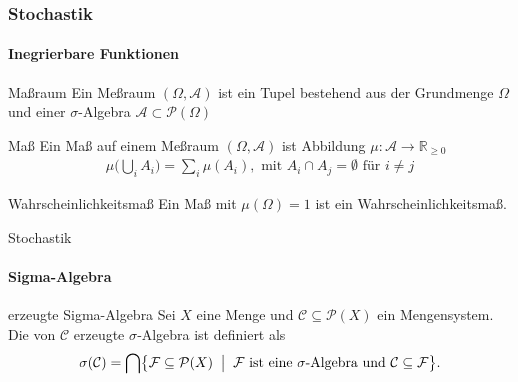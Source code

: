 \documentclass{beamer}
\begin{document}
\begin{frame}
    \frametitle{Stochastik}
\framesubtitle{Inegrierbare Funktionen}
    \begin{block}{Maßraum}
     Ein Meßraum $(\Omega, \mathcal{A})$ ist ein Tupel bestehend aus der Grundmenge $\Omega$ und einer $\sigma$-Algebra $\mathcal{A} \subset  \mathcal{P}(\Omega)$ 
\end{block}

\begin{block}{Maß}
    Ein Maß auf einem Meßraum $(\Omega, \mathcal{A})$ ist Abbildung
    $\mu : \mathcal{A} \to \mathbb{R}_{\geq 0}$
    \begin{align*}
    \mu \biggl(  \bigcup_i A_i  \biggr) = \sum_i \mu(A_i), \text{ mit } A_i \cap A_j = \emptyset \text{ für } i \neq j
    \end{align*}
    \end{block}
    
    \begin{block}{Wahrscheinlichkeitsmaß}
     Ein Maß mit $\mu (\Omega) = 1$ ist ein Wahrscheinlichkeitsmaß.
   \end{block}

 \end{frame}


  
 \begin{frame}{Stochastik}
    \framesubtitle{Sigma-Algebra}
    \begin{block}{erzeugte Sigma-Algebra}
    Sei $X$ eine Menge und $\mathcal{C}\subseteq\mathcal{P}(X)$ ein Mengensystem.\\[0.5em]
    Die von $\mathcal{C}$ erzeugte $\sigma$‑Algebra ist definiert als
    \[
      \sigma(\mathcal{C})
      =
      \bigcap\bigl\{\mathcal{F}\subseteq\mathcal{P}(X)\;\bigm|\;
        \mathcal{F}\text{ ist eine $\sigma$‑Algebra und }\mathcal{C}\subseteq\mathcal{F}\bigr\}.
    \]
    \end{block}
  \end{frame}
  
\end{document}
